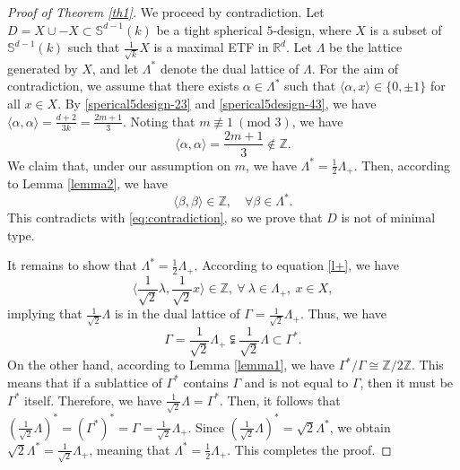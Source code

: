 \documentclass[11pt]{article}
\theoremstyle{definition}
\theoremstyle{remark}
\begin{document}
\begin{proof}[Proof of Theorem \ref{th1}]
We proceed by contradiction. Let $D=X\cup-X\subset\mathbb{S}^{d-1}(k)$ be a tight spherical $5$-design, where $X$ is a subset of $\mathbb{S}^{d-1}(k)$ such that $\frac{1}{\sqrt{k}} X$ is a maximal ETF in $\mathbb{R}^d$. Let $\Lambda$ be the lattice generated by $X$, and let $\Lambda^*$ denote the dual lattice of $\Lambda$. For the aim of contradiction, we assume that there exists $\alpha\in\Lambda^*$ such that $\langle \alpha,x\rangle\in\{0,\pm 1\}$ for all $x\in X$. 
By \eqref{sperical5design-23} and \eqref{sperical5design-43}, we have $\langle\alpha,\alpha\rangle=\frac{d+2}{3k}=\frac{2m+1}{3}$. Noting that $m\not\equiv1\ (\text{mod 3})$, we have
\begin{equation}\label{eq:contradiction}
\langle\alpha,\alpha\rangle=\frac{2m+1}{3}\notin\mathbb{Z}.
\end{equation}
We claim that, under our assumption on $m$, we have $\Lambda^*=\frac{1}{2}\Lambda_+$. Then, according to Lemma \ref{lemma2}, we have
\begin{equation*}
\langle \beta,\beta\rangle\in\mathbb{Z},\quad\forall \beta\in\Lambda^* .
\end{equation*}
This contradicts with \eqref{eq:contradiction}, so we prove that $D$ is not of minimal type. 


It remains to show that $\Lambda^*=\frac{1}{2}\Lambda_+$.
According to equation \eqref{l+}, we have 
\begin{equation*}
\langle \frac{1}{\sqrt{2}}\lambda,\frac{1}{\sqrt{2}} x\rangle\in\mathbb{Z}, \ \forall \ \lambda\in \Lambda_+,\ x\in X,
\end{equation*}
implying that $\frac{1}{\sqrt{2}}\Lambda$ is in the dual lattice of $\Gamma=\frac{1}{\sqrt{2}}\Lambda_+$. Thus, we have 
\begin{equation*}
\Gamma=\frac{1}{\sqrt{2}}\Lambda_+
\subsetneqq \frac{1}{\sqrt{2}}\Lambda\subset\Gamma^*.
\end{equation*}
On the other hand, according to Lemma \ref{lemma1}, we have $\Gamma^*\slash\Gamma\cong\mathbb{Z}\slash2\mathbb{Z}$.
This means that if a sublattice of $\Gamma^*$ contains $\Gamma$ and is not equal to $\Gamma$, then it must be $\Gamma^*$ itself.
Therefore, we have 
$\frac{1}{\sqrt{2}}\Lambda=\Gamma^*$. Then, it follows that $(\frac{1}{\sqrt{2}}\Lambda)^*=(\Gamma^*)^*=\Gamma=\frac{1}{\sqrt{2}}\Lambda_+$. Since $(\frac{1}{\sqrt{2}}\Lambda)^*=\sqrt{2}\Lambda^*$, we obtain $\sqrt{2}\Lambda^*=\frac{1}{\sqrt{2}}\Lambda_+$, meaning that $\Lambda^*=\frac{1}{2}\Lambda_+$. 
This completes the proof.

\end{proof}
\end{document}

